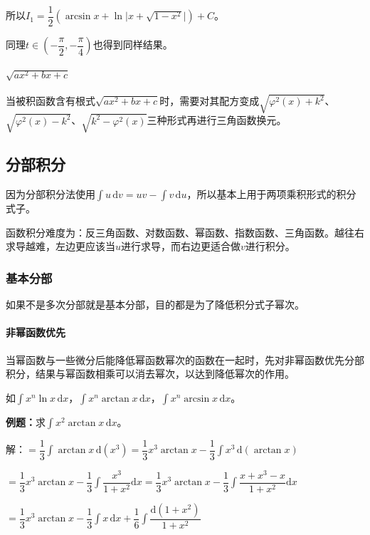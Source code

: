 \documentclass[UTF8, 12pt]{ctexart}
\begin{document}
所以$I_1=\dfrac{1}{2}(\arcsin x+\ln\vert x+\sqrt{1-x^2}\vert)+C$。

同理$t\in(-\dfrac{\pi}{2},-\dfrac{\pi}{4})$也得到同样结果。

\paragraph{\texorpdfstring{$\sqrt{ax^2+bx+c}$}\ } \leavevmode \medskip

当被积函数含有根式$\sqrt{ax^2+bx+c}$时，需要对其配方变成$\sqrt{\varphi^2(x)+k^2}$、$\sqrt{\varphi^2(x)-k^2}$、$\sqrt{k^2-\varphi^2(x)}$三种形式再进行三角函数换元。

\subsection{分部积分}

因为分部积分法使用$\int u\,\textrm{d}v=uv-\int v\,\textrm{d}u$，所以基本上用于两项乘积形式的积分式子。

函数积分难度为：反三角函数、对数函数、幂函数、指数函数、三角函数。越往右求导越难，左边更应该当$u$进行求导，而右边更适合做$v$进行积分。

\subsubsection{基本分部}

如果不是多次分部就是基本分部，目的都是为了降低积分式子幂次。

\paragraph{非幂函数优先} \leavevmode \medskip

当幂函数与一些微分后能降低幂函数幂次的函数在一起时，先对非幂函数优先分部积分，结果与幂函数相乘可以消去幂次，以达到降低幂次的作用。

如$\int x^n\ln x\,\textrm{d}x$，$\int x^n\arctan x\,\textrm{d}x$，$\int x^n\arcsin x\,\textrm{d}x$。

\textbf{例题：}求$\int x^2\arctan x\,\textrm{d}x$。

解：$=\dfrac{1}{3}\int\arctan x\,\textrm{d}(x^3)=\dfrac{1}{3}x^3\arctan x-\dfrac{1}{3}\int x^3\,\textrm{d}(\arctan x)$

$=\dfrac{1}{3}x^3\arctan x-\dfrac{1}{3}\displaystyle{\int\dfrac{x^3}{1+x^2}\textrm{d}x}=\dfrac{1}{3}x^3\arctan x-\dfrac{1}{3}\displaystyle{\int\dfrac{x+x^3-x}{1+x^2}\textrm{d}x}$

$=\dfrac{1}{3}x^3\arctan x-\dfrac{1}{3}\int x\,\textrm{d}x+\displaystyle{\dfrac{1}{6}\int\dfrac{\textrm{d}(1+x^2)}{1+x^2}}$
\end{document}
